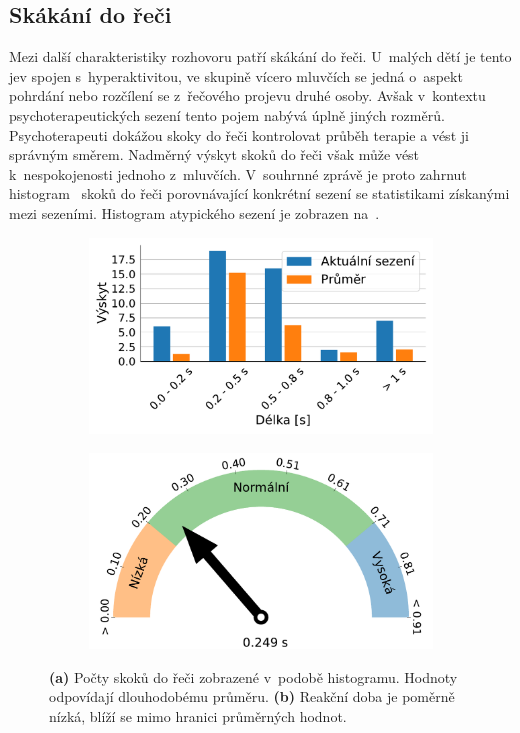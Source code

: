 \subsection{Skákání do řeči}
Mezi další charakteristiky rozhovoru patří skákání do řeči. U~malých dětí je tento jev spojen s~hyperaktivitou, ve skupině vícero mluvčích se jedná o~aspekt pohrdání nebo rozčílení se z~řečového projevu druhé osoby. Avšak v~kontextu psychoterapeutických sezení tento pojem nabývá úplně jiných rozměrů. Psychoterapeuti dokážou skoky do řeči kontrolovat průběh terapie a vést ji správným směrem. Nadměrný výskyt skoků do řeči však může vést k~nespokojenosti jednoho z~mluvčích. V~souhrnné zprávě je proto zahrnut histogram~\cite{histograms} skoků do řeči porovnávající konkrétní sezení se statistikami získanými mezi sezeními. Histogram atypického sezení je zobrazen na~.

\begin{figure}[ht]
    \begin{subfigure}{0.5\textwidth}
        \centering
        \includegraphics[width=\linewidth]{obrazky-figures/text_plots/client_interruptions.pdf}
        \caption{}
    \end{subfigure}%
    \hspace*{\fill}
    \begin{subfigure}{0.5\textwidth}
        \includegraphics[width=\linewidth]{obrazky-figures/text_plots/reaction_time_therapist.pdf}
        \caption{}
    \end{subfigure}
    \caption{\textbf{(a)} Počty skoků do řeči zobrazené v~podobě histogramu. Hodnoty odpovídají dlouhodobému průměru. \textbf{(b)} Reakční doba je poměrně nízká, blíží se mimo hranici průměrných hodnot.}
    \label{fig:Statisctics_butt_ins_reactions}
\end{figure}

